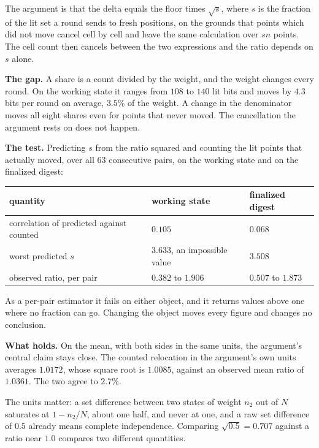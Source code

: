 The argument is that the delta equals the floor times \(\sqrt{s}\), where \(s\) is the fraction of the lit set a round sends to fresh positions, on the grounds that points which did not move cancel cell by cell and leave the same calculation over \(s n\) points. The cell count then cancels between the two expressions and the ratio depends on \(s\) alone.

\textbf{The gap.} A share is a count divided by the weight, and the weight changes every round. On the working state it ranges from \(108\) to \(140\) lit bits and moves by \(4.3\) bits per round on average, \(3.5\%\) of the weight. A change in the denominator moves all eight shares even for points that never moved. The cancellation the argument rests on does not happen.

\textbf{The test.} Predicting \(s\) from the ratio squared and counting the lit points that actually moved, over all \(63\) consecutive pairs, on the working state and on the finalized digest:

\begin{center}
\begin{tabular}{@{}lll@{}}
\toprule
quantity & working state & finalized digest \\
\midrule
correlation of predicted against counted & \(0.105\) & \(0.068\) \\
worst predicted \(s\) & \(3.633\), an impossible value & \(3.508\) \\
observed ratio, per pair & \(0.382\) to \(1.906\) & \(0.507\) to \(1.873\) \\
\bottomrule
\end{tabular}
\end{center}

As a per-pair estimator it fails on either object, and it returns values above one where no fraction can go. Changing the object moves every figure and changes no conclusion.

\textbf{What holds.} On the mean, with both sides in the same units, the argument's central claim stays close. The counted relocation in the argument's own units averages \(1.0172\), whose square root is \(1.0085\), against an observed mean ratio of \(1.0361\). The two agree to \(2.7\%\).

The units matter: a set difference between two states of weight \(n_2\) out of \(N\) saturates at \(1 - n_2/N\), about one half, and never at one, and a raw set difference of \(0.5\) already means complete independence. Comparing \(\sqrt{0.5} = 0.707\) against a ratio near \(1.0\) compares two different quantities.

